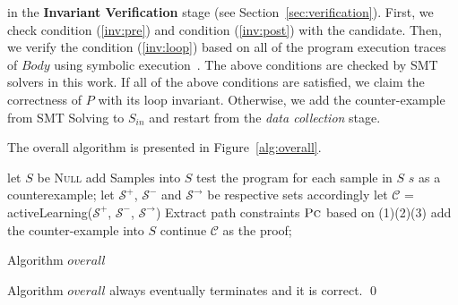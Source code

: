 \begin{itemize}
    in the \textbf{Invariant Verification} stage (see Section~\ref{sec:verification}). 
    First, we check condition (\ref{inv:pre}) and condition (\ref{inv:post}) with the candidate. 
    Then, we verify the condition (\ref{inv:loop}) 
    based on all of the program execution traces of $\mathit{Body}$ using symbolic execution~\cite{}. 
    The above conditions are checked by SMT~\cite{barrett2009satisfiability} solvers in this work. 
    If all of the above conditions are satisfied, 
    we claim the correctness of $P$ with its loop invariant. 
    Otherwise, we add the counter-example from SMT Solving to $S_{\mathit{in}}$ 
    and restart from the \emph{data collection} stage. 
\end{itemize}


The overall algorithm is presented in Figure~\ref{alg:overall}.
\begin{algorithm}[!h]
\SetAlgoVlined
\Indm
{}
\Indp
let $S$ be \textsc{Null}\;
 {
    add Samples into $S$\;
    test the program for each sample in $S$\;
     {
        \Return $s$ as a counterexample;
    }
    let $\mathcal{S}^+$, $\mathcal{S}^-$ and $\mathcal{S}^\rightarrow$ be respective sets accordingly\;
    let $\mathcal{C}$ = activeLearning($\mathcal{S}^+$, $\mathcal{S}^-$, $\mathcal{S}^\rightarrow$)\;
    Extract path constraints $\textsc{Pc}$ based on (1)(2)(3)\;
     {
         {
            add the counter-example into $S$\;
            continue\;
        }
    }
    \Return $\mathcal{C}$ as the proof;
}
\caption{Algorithm $overall$}
\label{alg:overall}
\end{algorithm}


\begin{theorem}
Algorithm $overall$ always eventually terminates and it is correct. \hfill \qed
\end{theorem}


